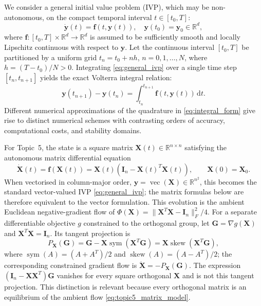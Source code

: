 \documentclass[11pt,a4paper]{article}
\theoremstyle{definition}
\theoremstyle{remark}
\begin{document}
We consider a general initial value problem (IVP), which may be non-autonomous, on the compact temporal interval $t \in [t_0, T]$:
\begin{equation}
\label{eq:general_ivp}
\dot{\mathbf{y}}(t) = \mathbf{f}(t, \mathbf{y}(t)), \quad \mathbf{y}(t_0) = \mathbf{y}_0 \in \mathbb{R}^d,
\end{equation}
where $\mathbf{f}: [t_0, T] \times \mathbb{R}^d \to \mathbb{R}^d$ is assumed to be sufficiently smooth and locally Lipschitz continuous with respect to $\mathbf{y}$. Let the continuous interval $[t_0, T]$ be partitioned by a uniform grid
$t_n=t_0+nh$, $n=0,1,\ldots,N$, where $h=(T-t_0)/N>0$. Integrating \eqref{eq:general_ivp} over a single time step $[t_n,t_{n+1}]$ yields the exact Volterra integral relation:
\begin{equation}
\label{eq:integral_form}
\mathbf{y}(t_{n+1}) - \mathbf{y}(t_n) = \int_{t_n}^{t_{n+1}} \mathbf{f}(t, \mathbf{y}(t)) \, \mathrm{d}t.
\end{equation}
Different numerical approximations of the quadrature in \eqref{eq:integral_form} give rise to distinct numerical schemes with contrasting orders of accuracy, computational costs, and stability domains.

For Topic~5, the state is a square matrix
$\mathbf{X}(t)\in\mathbb{R}^{n\times n}$ satisfying the autonomous
matrix differential equation
\begin{equation}
\label{eq:topic5_matrix_model}
\dot{\mathbf{X}}(t)
=
\mathbf{f}(\mathbf{X}(t))
=
\mathbf{X}(t)\left(\mathbf{I}_n-\mathbf{X}(t)^T\mathbf{X}(t)\right),
\qquad
\mathbf{X}(0)=\mathbf{X}_0.
\end{equation}
When vectorised in column-major order,
$\mathbf{y}=\operatorname{vec}(\mathbf{X})\in\mathbb{R}^{n^2}$,
this becomes the standard vector-valued IVP \eqref{eq:general_ivp}; the
matrix formulas below are therefore equivalent to the vector formulation.
This evolution is the ambient Euclidean negative-gradient flow of
$\Phi(\mathbf X)=\|\mathbf X^T\mathbf X-\mathbf I_n\|_F^2/4$.
For a separate differentiable objective $g$ constrained to the
orthogonal group, let $\mathbf G=\nabla g(\mathbf X)$ and
$\mathbf X^T\mathbf X=\mathbf I_n$. Its tangent projection is
\begin{equation}
\label{eq:orthogonal_tangent_projection}
P_{\mathbf X}(\mathbf G)
=\mathbf G-\mathbf X\operatorname{sym}(\mathbf X^T\mathbf G)
=\mathbf X\operatorname{skew}(\mathbf X^T\mathbf G),
\end{equation}
where $\operatorname{sym}(A)=(A+A^T)/2$ and
$\operatorname{skew}(A)=(A-A^T)/2$; the corresponding constrained
gradient flow is $\dot{\mathbf X}=-P_{\mathbf X}(\mathbf G)$.
The expression $(\mathbf I_n-\mathbf X\mathbf X^T)\mathbf G$ vanishes
for every square orthogonal $\mathbf X$ and is not this tangent
projection. This distinction is relevant because every orthogonal
matrix is an equilibrium of the ambient flow \eqref{eq:topic5_matrix_model}.
\end{document}
